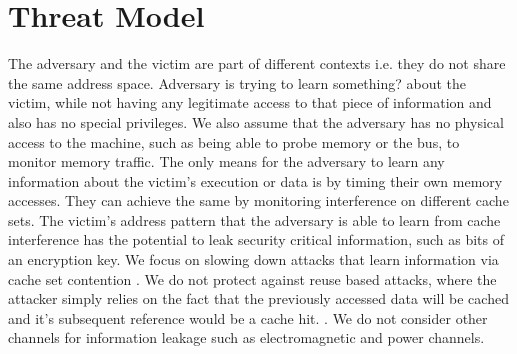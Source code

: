 \section{Threat Model}
The adversary and the victim are part of different contexts i.e. they do not share the same address space. Adversary is trying to learn something? about the victim, while not having any legitimate access to that piece of information and also has no special privileges. We also assume that the adversary has no physical access to the machine, such as being able to probe memory or the bus, to monitor memory traffic. The only means for the adversary to learn any information about the victim's execution or data is by timing their own memory accesses. They can achieve the same by monitoring interference on different cache sets. The victim's address pattern that the adversary is able to learn from cache interference has the potential to leak security critical information, such as bits of an encryption key. We focus on slowing down attacks that learn information via cache set contention \cite{p+p}. We do not protect against reuse based attacks, where the attacker simply relies on the fact that the previously accessed data will be cached and it's subsequent reference would be a cache hit. \cite{rfill,F+F}.  We do not consider other channels for information leakage such as electromagnetic \cite{} and power channels\cite{}.       
